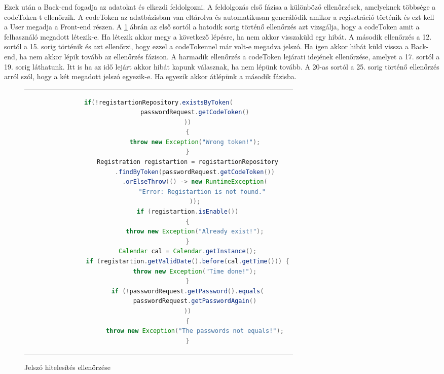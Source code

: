 \begin{itemize}
Ezek után a Back-end fogadja az adatokat és elkezdi feldolgozni. A feldolgozás első fázisa a különböző ellenőrzések, amelyeknek többsége a codeToken-t ellenőrzik.  A codeToken az adatbázisban van eltárolva és automatikusan generálódik amikor a regisztráció történik és ezt kell a User megadja a Front-end részen. A \ref{passValCheck} ábrán az első sortól a hatodik sorig történő ellenőrzés azt vizsgálja, hogy a codeToken amit a felhasználó megadott létezik-e. Ha létezik akkor megy a következő lépésre, ha nem akkor visszaküld egy hibát. A második ellenőrzés a 12. sortól a 15. sorig történik és azt ellenőrzi, hogy ezzel a codeTokennel már volt-e megadva jelszó. Ha igen akkor hibát küld vissza a Back-end, ha nem akkor lépik tovább az ellenőrzés fázison. A harmadik ellenőrzés a codeToken lejárati idejének ellenőrzése, amelyet a 17. sortól a 19. sorig láthatunk. Itt is ha az idő lejárt akkor hibát kapunk válasznak, ha nem lépünk tovább. A 20-as sortól a 25. sorig történő ellenőrzés arról szól, hogy a két megadott jelszó egyezik-e. Ha egyezik akkor átlépünk a második fázisba.
	\begin{figure}[thp]
		\centering
		\caption{Jelszó hitelesítés ellenőrzése}
		\label{passValCheck}
		\begin{tabular}{c}
			\begin{lstlisting}[language=JAVA]
				if(!registartionRepository.existsByToken(
					passwordRequest.getCodeToken()
				))
				{
					throw new Exception("Wrong token!");
				}
				Registration registartion = registartionRepository
					.findByToken(passwordRequest.getCodeToken())
					.orElseThrow(() -> new RuntimeException(
						"Error: Registartion is not found."
					));
				if (registartion.isEnable())
				{
					throw new Exception("Already exist!");
				}
				Calendar cal = Calendar.getInstance();
				if (registartion.getValidDate().before(cal.getTime())) {
					throw new Exception("Time done!");
				}
				if (!passwordRequest.getPassword().equals(
					passwordRequest.getPasswordAgain()
				))
				{
					throw new Exception("The passwords not equals!");
				}
			\end{lstlisting}
		\end{tabular}
	\end{figure}
	

\end{itemize}
